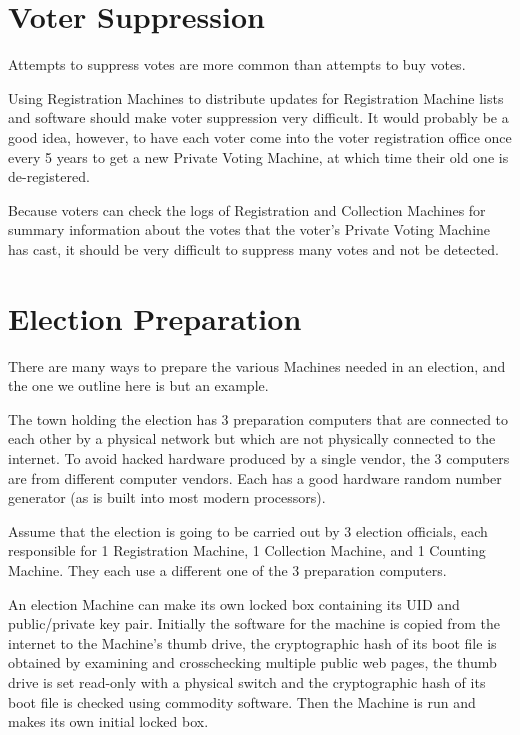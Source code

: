 \documentclass[12pt]{article}
\begin{document}
\section{Voter Suppression}

Attempts to suppress votes are more common than attempts to buy votes.

Using Registration Machines to distribute updates for Registration
Machine lists and software should make voter suppression very difficult.
It would probably be a good idea, however, to have each voter come into
the voter registration office once every 5 years to get a new
Private Voting Machine, at which time their old one is de-registered.

Because voters can check the logs of Registration and Collection Machines
for summary information about the votes that the voter's Private Voting Machine
has cast, it should be very difficult to suppress many
votes and not be detected.

\section{Election Preparation}

There are many ways to prepare the various Machines needed in an election,
and the one we outline here is but an example.

The town holding the election has 3 preparation computers that are
connected to each other by a physical network but which are not
physically connected to the internet.  To avoid hacked hardware
produced by a single vendor, the 3 computers are from different
computer vendors.  Each has a good hardware random number generator
(as is built into most modern processors).

Assume that the election is going to be carried out by 3 election
officials, each responsible for 1 Registration Machine, 1 Collection
Machine, and 1 Counting Machine.  They each use a different one of
the 3 preparation computers.

An election Machine can make its own locked box containing its UID
and public/private key pair.  Initially the software for the machine
is copied from the internet to the Machine's thumb drive,
the cryptographic hash of its boot file is obtained by examining
and crosschecking multiple public web pages, the thumb
drive is set read-only with a physical switch and the cryptographic
hash of its boot file is checked using commodity software.
Then the Machine is run and makes its own initial locked box.
\end{document}
